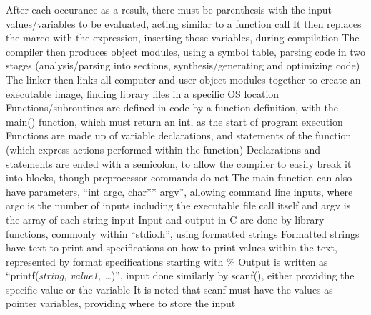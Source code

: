 \documentclass[11 pt, twoside]{article}
\newenvironment{outline*}
{
	\begin{outline}[enumerate]
	}
	{\end{outline}
}
\begin{document}
\begin{outline*}
\4 After each occurance as a result, there must be parenthesis with the input values/variables to be evaluated, acting similar to a function call
\4 It then replaces the marco with the expression, inserting those variables, during compilation
\2 The compiler then produces object modules, using a symbol table, parsing code in two stages (analysis/parsing into sections, synthesis/generating and optimizing code)
\2 The linker then links all computer and user object modules together to create an executable image, finding library files in a specific OS location
\1 Functions/subroutines are defined in code by a function definition, with the main() function, which must return an int, as the start of program execution
\2 Functions are made up of variable declarations, and statements of the function (which express actions performed within the function)
\2 Declarations and statements are ended with a semicolon, to allow the compiler to easily break it into blocks, though preprocessor commands do not
\2 The main function can also have parameters, ``int argc, char** argv'', allowing command line inputs, where argc is the number of inputs including the executable file call itself and argv is the array of each string input
\1 Input and output in C are done by library functions, commonly within ``stdio.h'', using formatted strings
\2 Formatted strings have text to print and specifications on how to print values within the text, represented by format specifications starting with \%
\2 Output is written as ``printf(\textit{string, value1, \dots})'', input done similarly by scanf(), either providing the specific value or the variable
\3 It is noted that scanf must have the values as pointer variables, providing where to store the input
\end{outline*}
\end{document}
